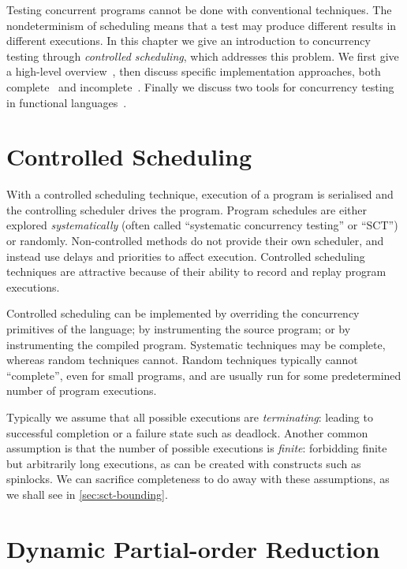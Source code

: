 Testing concurrent programs cannot be done with conventional
techniques.  The nondeterminism of scheduling means that a test may
produce different results in different executions.  In this chapter we
give an introduction to concurrency testing through \emph{controlled
  scheduling}, which addresses this problem.  We first give a
high-level overview~, then discuss specific
implementation approaches, both complete~ and
incomplete~.  Finally we discuss two tools for
concurrency testing in functional languages~.

\section{Controlled Scheduling}
\label{sec:sct-fundamentals}

With a controlled scheduling technique, execution of a program is
serialised and the controlling scheduler drives the program.  Program
schedules are either explored
\emph{systematically}\cite{coons2013,flanagan2005,musuvathi2008,musuvathi2007}
(often called ``systematic concurrency testing'' or ``SCT'') or
randomly\cite{burckhardt2010,thomson2016}.  Non-controlled methods do
not provide their own scheduler, and instead use delays and priorities
to affect execution\cite{yu2012}.  Controlled scheduling techniques
are attractive because of their ability to record and replay program
executions.

Controlled scheduling can be implemented by overriding the concurrency
primitives of the language\cite{walker2015}; by instrumenting the
source program\cite{claessen2009}; or by instrumenting the compiled
program\cite{musuvathi2006,yu2012}.  Systematic techniques may be
complete, whereas random techniques cannot.  Random techniques
typically cannot ``complete'', even for small programs, and are
usually run for some predetermined number of program executions.

Typically we assume that all possible executions are
\emph{terminating}: leading to successful completion or a failure
state such as deadlock.  Another common assumption is that the number
of possible executions is \emph{finite}: forbidding finite but
arbitrarily long executions, as can be created with constructs such as
spinlocks.  We can sacrifice completeness to do away with these
assumptions, as we shall see in \cref{sec:sct-bounding}.

\section{Dynamic Partial-order Reduction}
\label{sec:sct-dpor}

